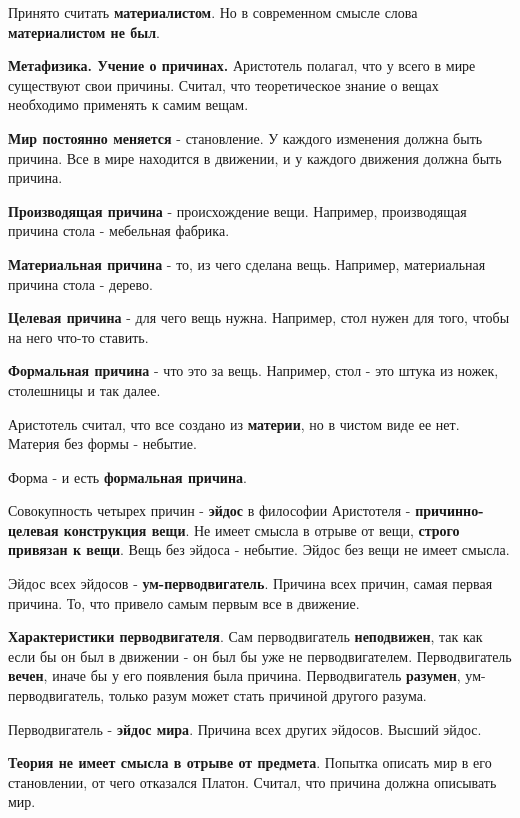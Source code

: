 \documentclass{article}
\begin{document}
\begin{flushleft}
Принято считать \textbf{материалистом}. Но в современном смысле слова \textbf{материалистом не был}.

\hfill

\textbf{Метафизика. Учение о причинах.} Аристотель полагал, что у всего в мире существуют свои причины. Считал, что теоретическое знание о вещах необходимо применять к самим вещам.

\textbf{Мир постоянно меняется} - становление. У каждого изменения должна быть причина. Все в мире находится в движении, и у каждого движения должна быть причина.

\hfill

\textbf{Производящая причина} - происхождение вещи. Например, производящая причина стола - мебельная фабрика.

\textbf{Материальная причина} - то, из чего сделана вещь. Например, материальная причина стола - дерево.

\textbf{Целевая причина} - для чего вещь нужна. Например, стол нужен для того, чтобы на него что-то ставить.

\textbf{Формальная причина} - что это за вещь. Например, стол - это штука из ножек, столешницы и так далее.

\hfill

Аристотель считал, что все создано из \textbf{материи}, но в чистом виде ее нет. Материя без формы - небытие.

Форма - и есть \textbf{формальная причина}.

\hfill

Совокупность четырех причин - \textbf{эйдос} в философии Аристотеля - \textbf{причинно-целевая конструкция вещи}. Не имеет смысла в отрыве от вещи, \textbf{строго привязан к вещи}. Вещь без эйдоса - небытие. Эйдос без вещи не имеет смысла.

\hfill

Эйдос всех эйдосов - \textbf{ум-перводвигатель}. Причина всех причин, самая первая причина. То, что привело самым первым все в движение.

\hfill

\textbf{Характеристики перводвигателя}. Сам перводвигатель \textbf{неподвижен}, так как если бы он был в движении - он был бы уже не перводвигателем. Перводвигатель \textbf{вечен}, иначе бы у его появления была причина. Перводвигатель \textbf{разумен}, ум-перводвигатель, только разум может стать причиной другого разума. 

Перводвигатель - \textbf{эйдос мира}. Причина всех других эйдосов. Высший эйдос.

\hfill

\textbf{Теория не имеет смысла в отрыве от предмета}. Попытка описать мир в его становлении, от чего отказался Платон. Считал, что причина должна описывать мир.

\end{flushleft}
\end{document}

